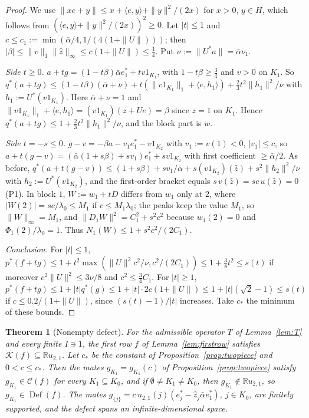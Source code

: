 \documentclass[10pt]{amsart}
\newtheorem{theorem}{Theorem}[section]
\theoremstyle{definition}
\theoremstyle{remark}
\newcommand{\R}{\mathbb R}
\newcommand{\Cset}{\mathcal C}
\newcommand{\Def}{\operatorname{Def}}
\newcommand{\zh}{\hat z}
\newcommand{\ip}[2]{\langle #1,#2\rangle}
\begin{document}
\begin{proof}
We use $\|xe+y\|\le x+\ip ey+\|y\|^2/(2x)$ for $x>0$, $y\in H$, which follows
from $(\ip ey+\|y\|^2/(2x))^2\ge0$.  Let $|t|\le1$ and $c\le c_1:=
\min(\bar\alpha/4,1/(4(1+\|U\|)))$; then $|\beta|\le\|v\|_1\|\zh\|_\infty\le
c(1+\|U\|)\le\frac14$.  Put $\nu:=\|U^*a\|=\bar\alpha\nu_1$.

\emph{Side $t\ge0$.}  $a+tg=(1-t\beta)\bar\alpha e_1^*+tv1_{K_1}$, with
$1-t\beta\ge\frac34$ and $v>0$ on $K_1$.  So
$q^*(a+tg)\le(1-t\beta)(\bar\alpha+\nu)+t(\|v1_{K_1}\|_1+\ip e{h_1})+\frac23t^2
\|h_1\|^2/\nu$ with $h_1:=U^*(v1_{K_1})$.  Here $\bar\alpha+\nu=1$ and
$\|v1_{K_1}\|_1+\ip e{h_1}=(v1_{K_1})(z+Ue)=\beta$ since $z=1$ on $K_1$.
Hence $q^*(a+tg)\le1+\frac23t^2\|h_1\|^2/\nu$, and the block part is $w$.

\emph{Side $t=-s\le0$.}  $g-v=-\beta a-v_1e_1^*-v1_{K_2}$ with
$v_1:=v(1)<0$, $|v_1|\le c$, so $a+t(g-v)=(\bar\alpha(1+s\beta)+sv_1)e_1^*+
sv1_{K_2}$ with first coefficient $\ge\bar\alpha/2$.  As before,
$q^*(a+t(g-v))\le(1+s\beta)+sv_1/\bar\alpha+s(v1_{K_2})(\zh)+s^2\|h_2\|^2/\nu$
with $h_2:=U^*(v1_{K_2})$, and the first-order bracket equals
$s\,v(\zh)=sc\,u(\zh)=0$ (P1).  In block $1$, $W:=w_1+tD$ differs from
$w_1$ only at $2$, where $|W(2)|=sc/\lambda_0\le M_1$ if $c\le M_1\lambda_0$;
the peaks keep the value $M_1$, so $\|W\|_\infty=M_1$, and
$\|D_1W\|^2=C_1^2+s^2c^2$ because $w_1(2)=0$ and $\Phi_1(2)/\lambda_0=1$.
Thus $N_1(W)\le1+s^2c^2/(2C_1)$.

\emph{Conclusion.}  For $|t|\le1$, $p^*(f+tg)\le1+t^2\max(\|U\|^2c^2/\nu,
c^2/(2C_1))\le1+\frac38t^2\le s(t)$ if moreover $c^2\|U\|^2\le3\nu/8$ and
$c^2\le\frac34C_1$.  For $|t|\ge1$, $p^*(f+tg)\le1+|t|q^*(g)\le1+|t|\cdot
2c(1+\|U\|)\le1+|t|(\sqrt2-1)\le s(t)$ if $c\le0.2/(1+\|U\|)$, since
$(s(t)-1)/|t|$ increases.  Take $c_*$ the minimum of these bounds.
\end{proof}

\begin{theorem}[Nonempty defect]\label{thm:defect}
For the admissible operator $T$ of Lemma~\ref{lem:T} and every finite
$I\ni1$, the first row $f$ of Lemma~\ref{lem:firstrow} satisfies
$\mathcal K(f)\subseteq\R u_{2,1}$.  Let $c_*$ be the constant of
Proposition~\ref{prop:twopiece} and $0<c\le c_*$.  Then the mates
$g_{K_1}=g_{K_1}(c)$ of Proposition~\ref{prop:twopiece} satisfy
$g_{K_1}\in\Cset(f)$ for every $K_1\subseteq K_0$, and if
$\emptyset\ne K_1\ne K_0$, then $g_{K_1}\notin\R u_{2,1}$, so
$g_{K_1}\in\Def(f)$.  The mates $g_{\{j\}}=c\,u_{2,1}(j)
(e_j^*-\zh_j\bar\alpha e_1^*)$, $j\in K_0$, are finitely supported, and the
defect spans an infinite-dimensional space.
\end{theorem}
\end{document}
